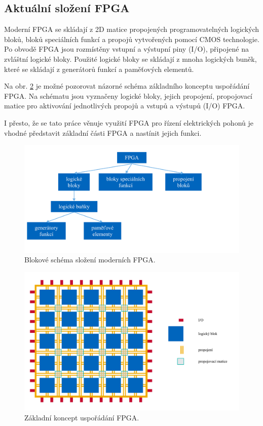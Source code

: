 \documentclass[a4paper, twoside, 11pt]{article}
\begin{document}
		\subsection{Aktuální složení FPGA}
		Moderní FPGA se skládají z 2D matice propojených programovatelných logických bloků, bloků speciálních funkcí a propojů vytvořených pomocí CMOS technologie. Po obvodě FPGA jsou rozmístěny vstupní a výstupní piny (I/O), připojené na zvláštní logické bloky. Použité logické bloky se skládají z mnoha logických buněk, které se skládají z generátorů funkcí a paměťových elementů. \cite{Sass2010}\par
		Na obr. \ref{fig:fpga-general-design} je možné pozorovat názorné schéma základního konceptu uspořádání FPGA. Na schématu jsou vyznačeny logické bloky, jejich propojení, propojovací matice pro aktivování jednotlivých propojů a vstupů a výstupů (I/O) FPGA.\par
		I přesto, že se tato práce věnuje využití FPGA pro řízení elektrických pohonů je vhodné představit základní části FPGA a nastínit jejich funkci.

		\begin{figure}[htbp!]
			\centering
				\includegraphics[width=1\textwidth]{src/pdf/fpga-skladba.pdf} 
				\caption{Blokové schéma složení moderních FPGA.}
				\label{fig:fpga-skladba}
		\end{figure}


		\begin{figure}[htbp!]
			\centering
				\includegraphics[width=1\textwidth]{src/pdf/fpga-general-design.pdf} 
				\caption{Základní koncept uspořádání FPGA.}
				\label{fig:fpga-general-design}
		\end{figure}
\end{document}
